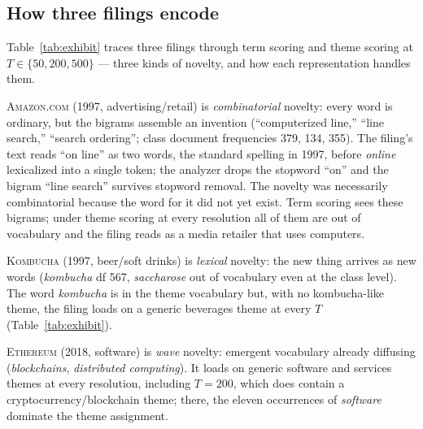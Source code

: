 \subsection{How three filings encode}\label{app:exhibit}

Table~\ref{tab:exhibit} traces three filings through term scoring and theme
scoring at $T \in \{50, 200, 500\}$ --- three kinds of novelty, and how each
representation handles them.

\textsc{Amazon.com} (1997, advertising/retail) is \emph{combinatorial}
novelty: every word is ordinary, but the bigrams assemble an invention
(``computerized line,'' ``line search,'' ``search ordering''; class
document frequencies 379, 134, 355). The filing's text reads ``on line''
as two words, the standard spelling in 1997, before \emph{online}
lexicalized into a single token; the analyzer drops the stopword ``on''
and the bigram ``line search'' survives
stopword removal. The novelty was necessarily combinatorial
because the word for it did not yet exist. Term scoring sees these
bigrams; under theme scoring at every resolution all of them are out of
vocabulary and the filing reads as a media retailer that uses computers.

\textsc{Kombucha} (1997, beer/soft drinks) is \emph{lexical} novelty: the
new thing arrives as new words (\emph{kombucha} df 567, \emph{saccharose}
out of vocabulary even at the class level). The word \emph{kombucha} is in
the theme vocabulary but, with no kombucha-like theme, the filing loads on
a generic beverages theme at every $T$ (Table~\ref{tab:exhibit}).

\textsc{Ethereum} (2018, software) is \emph{wave} novelty: emergent
vocabulary already diffusing (\emph{blockchains}, \emph{distributed
computing}). It loads on generic software and services themes at every
resolution, including $T = 200$, which does contain a
cryptocurrency/blockchain theme; there, the eleven occurrences of
\emph{software} dominate the theme assignment.

